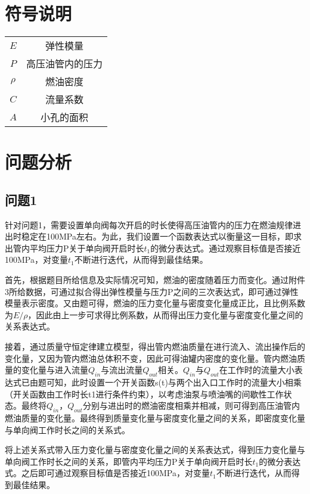 \documentclass{cumcmthesis}
\begin{document}
\section{符号说明}

\begin{center}
	\begin{tabular}{cc}
		\toprule[1.5pt]
		\makebox[0.3\textwidth][c]{符号}	& \makebox[0.4\textwidth][c]{意义} \\
		\hline
	 $E$ & 弹性模量 \\
	$P$ & 高压油管内的压力 \\  
	$\rho$ & 燃油密度 \\ 
	$C$ & 流量系数 \\
	$A$ & 小孔的面积 \\
	\bottomrule[1.5pt]
	\end{tabular}
\end{center}

\section{问题分析}
\subsection{问题1}
针对问题1，需要设置单向阀每次开启的时长使得高压油管内的压力在燃油规律进出时稳定在100MPa左右。为此，我们设置一个函数表达式以衡量这一目标，即求出管内平均压力P关于单向阀开启时长$t_{1}$的微分表达式。通过观察目标值是否接近100MPa，对变量$t_{1}$不断进行迭代，从而得到最佳结果。

首先，根据题目所给信息及实际情况可知，燃油的密度随着压力而变化。通过附件3所给数据，可通过拟合得出弹性模量与压力P之间的三次表达式，即可通过弹性模量表示密度。又由题可得，燃油的压力变化量与密度变化量成正比，且比例系数为$E/\rho$，因此由上一步可求得比例系数，从而得出压力变化量与密度变化量之间的关系表达式。

接着，通过质量守恒定律建立模型，得出管内燃油质量在进行流入、流出操作后的变化量，又因为管内燃油总体积不变，因此可得油罐内密度的变化量。管内燃油质量的变化量与进入流量$Q_{in}$与流出流量$Q_{out}$相关。$Q_{in}$与$Q_{out}$在工作时的流量大小表达式已由题可知，此时设置一个开关函数s(t)与两个出入口工作时的流量大小相乘（开关函数由工作时长t1进行条件约束），以考虑油泵与喷油嘴的间歇性工作状态。最终将$Q_{in}$，$Q_{out}$分别与进出时的燃油密度相乘并相减，则可得到高压油管内燃油质量的变化量。最终得到质量变化量与密度变化量之间的关系，即密度变化量与单向阀工作时长之间的关系式。

将上述关系式带入压力变化量与密度变化量之间的关系表达式，得到压力变化量与单向阀工作时长之间的关系，即管内平均压力P关于单向阀开启时长$t_{1}$的微分表达式。之后即可通过观察目标值是否接近100MPa，对变量$t_{1}$不断进行迭代，从而得到最佳结果。
\end{document}
